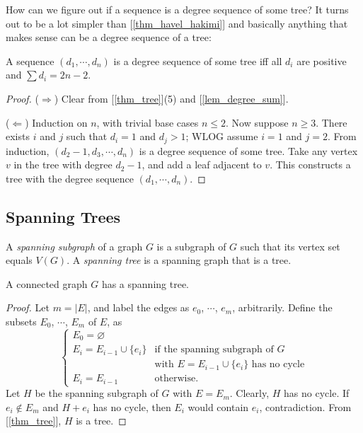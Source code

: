         How can we figure out if a sequence is a degree sequence of some tree? It turns out to be a lot simpler than [\ref{thm_havel_hakimi}] and basically anything that makes sense can be a degree sequence of a tree:
        
        \begin{thm} \label{thm_tree_degree}
            A sequence $(d_1,\cdots,d_n)$ is a degree sequence of some tree iff all $d_i$ are positive and $\sum d_i = 2n-2$.
        \end{thm}
        
        \begin{proof}
            ($\Rightarrow$) Clear from [\ref{thm_tree}](5) and [\ref{lem_degree_sum}].
            
            ($\Leftarrow$) Induction on $n$, with trivial base cases $n \leq 2$. Now suppose $n \geq 3$. There exists $i$ and $j$ such that $d_i=1$ and $d_j>1$; WLOG assume $i=1$ and $j=2$. From induction, $(d_2-1,d_3,\cdots,d_n)$ is a degree sequence of some tree. Take any vertex $v$ in the tree with degree $d_2-1$, and add a leaf adjacent to $v$. This constructs a tree with the degree sequence $(d_1,\cdots,d_n)$.
        \end{proof}
    
    \subsection{Spanning Trees}
        \begin{defn} \label{def_spanning}
            A \emph{spanning subgraph} of a graph $G$ is a subgraph of $G$ such that its vertex set equals $V(G)$. A \emph{spanning tree} is a spanning graph that is a tree.
        \end{defn}
        
        \begin{thm} \label{thm_spanning_tree}
            A connected graph $G$ has a spanning tree.
        \end{thm}
        
        \begin{proof}
            Let $m = |E|$, and label the edges as $e_0$, $\cdots$, $e_m$, arbitrarily. Define the subsets $E_0$, $\cdots$, $E_m$ of $E$, as \begin{displaymath} \begin{cases}
                E_0 = \varnothing \\
                E_i = E_{i-1} \cup \{e_i\} & \text{if the spanning subgraph of $G$} \\
                & \text{with $E = E_{i-1} \cup \{e_i\}$ has no cycle} \\
                E_i = E_{i-1} & \text{otherwise.}
            \end{cases} \end{displaymath}
            Let $H$ be the spanning subgraph of $G$ with $E = E_m$. Clearly, $H$ has no cycle. If $e_i \notin E_m$ and $H+e_i$ has no cycle, then $E_i$ would contain $e_i$, contradiction. From [\ref{thm_tree}], $H$ is a tree.
        \end{proof}
        
